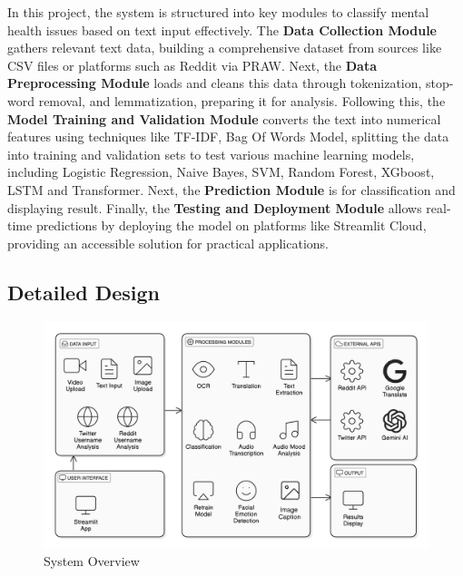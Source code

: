 \noindent
In this project, the system is structured into key modules to classify mental health issues based on text input effectively. The \textbf{Data Collection Module} gathers relevant text data, building a comprehensive dataset from sources like CSV files or platforms such as Reddit via PRAW. Next, the \textbf{Data Preprocessing Module} loads and cleans this data through tokenization, stop-word removal, and lemmatization, preparing it for analysis. Following this, the \textbf{Model Training and Validation Module} converts the text into numerical features using techniques like TF-IDF, Bag Of Words Model, splitting the data into training and validation sets to test various machine learning models, including Logistic Regression, Naive Bayes, SVM, Random Forest, XGboost, LSTM and Transformer. Next, the \textbf{Prediction Module} is for classification and displaying result. Finally, the \textbf{Testing and Deployment Module} allows real-time predictions by deploying the model on platforms like Streamlit Cloud, providing an accessible solution for practical applications.

\subsection{Detailed Design}
\begin{figure}[h!]  
    \centering
    \includegraphics[width=1.0\textwidth]{Images/System Overview.png}  
    \caption{System Overview}
    \label{System Overview}  %
\end{figure}


\vspace{.1in}

